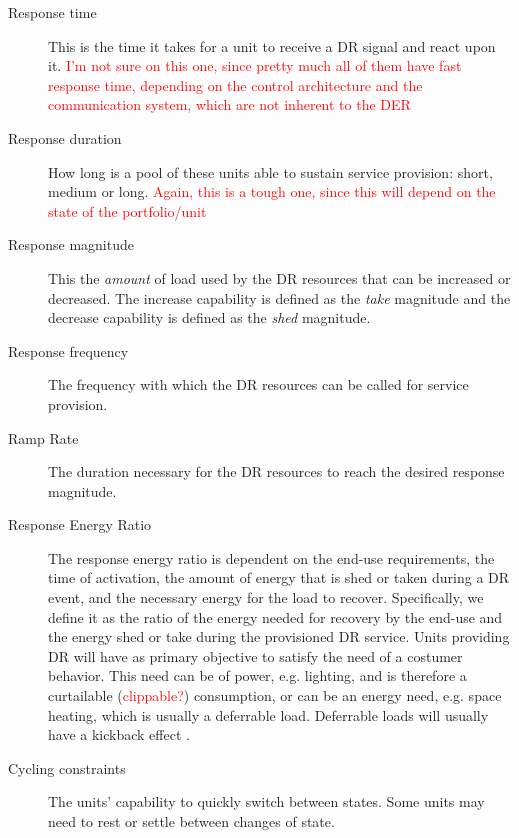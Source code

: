 \begin{description}
	\item[Response time] This is the time it takes for a unit to receive a DR signal and react upon it. \textcolor{red}{I'm not sure on this one, since pretty much all of them have fast response time, depending on the control architecture and the communication system, which are not inherent to the DER}
	\item[Response duration] How long is a pool of these units able to sustain service provision: short, medium or long. \textcolor{red}{Again, this is a tough one, since this will depend on the state of the portfolio/unit}
	\item[Response magnitude] This the \emph{amount} of load used by the DR resources that can be increased or decreased. The increase capability is defined as the \emph{take} magnitude and the decrease capability is defined as the \emph{shed} magnitude.
	\item[Response frequency] The frequency with which the DR resources can be called for service provision. 
	\item[Ramp Rate] The duration necessary for the DR resources to reach the desired response magnitude.
	\item[Response Energy Ratio] The response energy ratio is dependent on the end-use requirements, the time of activation, the amount of energy that is shed or taken during a DR event, and the necessary energy for the load to recover.
Specifically, we define it as the ratio of the energy needed for recovery by the end-use and the energy shed or take during the provisioned DR service.  
	Units providing DR will have as primary objective to satisfy the need of a costumer behavior. This need can be of power, e.g. lighting, and is therefore a curtailable (\textcolor{red}{clippable?}) consumption, or can be an energy need, e.g. space heating, which is usually a deferrable load. Deferrable loads will usually have a kickback effect \cite{han2014load}.
	\item[Cycling constraints] The units' capability to quickly switch between states. Some units may need to rest or settle between changes of state.  
\end{description}

